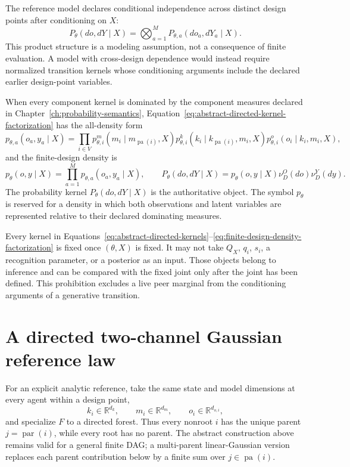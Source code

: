 The reference model declares conditional independence across distinct design points after conditioning on \(X\):
\begin{equation}
P_\theta(do,dY\mid X)
=\bigotimes_{a=1}^{M}P_{\theta,a}(do_a,dY_a\mid X).
\label{eq:finite-design-conditional-product}
\end{equation}
This product structure is a modeling assumption, not a consequence of finite evaluation. A model with cross-design dependence would instead require normalized transition kernels whose conditioning arguments include the declared earlier design-point variables.

When every component kernel is dominated by the component measures declared in Chapter~\ref{ch:probability-semantics}, Equation~\eqref{eq:abstract-directed-kernel-factorization} has the all-density form
\begin{equation}
p_{\theta,a}(o_a,y_a\mid X)
=\prod_{i\in V}
p_{\theta,i}^{m}(m_i\mid m_{\operatorname{pa}(i)},X)
p_{\theta,i}^{k}(k_i\mid k_{\operatorname{pa}(i)},m_i,X)
p_{\theta,i}^{o}(o_i\mid k_i,m_i,X),
\label{eq:abstract-directed-density-factorization}
\end{equation}
and the finite-design density is
\begin{equation}
p_\theta(o,y\mid X)=\prod_{a=1}^{M}p_{\theta,a}(o_a,y_a\mid X),
\qquad
P_\theta(do,dY\mid X)
=p_\theta(o,y\mid X)\nu_D^O(do)\nu_D^Y(dy).
\label{eq:finite-design-density-factorization}
\end{equation}
The probability kernel \(P_\theta(do,dY\mid X)\) is the authoritative object. The symbol \(p_\theta\) is reserved for a density in which both observations and latent variables are represented relative to their declared dominating measures.

Every kernel in Equations~\eqref{eq:abstract-directed-kernels}--\eqref{eq:finite-design-density-factorization} is fixed once \((\theta,X)\) is fixed. It may not take \(Q_X\), \(q_i\), \(s_i\), a recognition parameter, or a posterior as an input. Those objects belong to inference and can be compared with the fixed joint only after the joint has been defined. This prohibition excludes a live peer marginal from the conditioning arguments of a generative transition.

\section{A directed two-channel Gaussian reference law}

For an explicit analytic reference, take the same state and model dimensions at every agent within a design point,
\begin{equation}
k_i\in\mathbb R^{d_k},
\qquad
m_i\in\mathbb R^{d_m},
\qquad
o_i\in\mathbb R^{d_{o,i}},
\label{eq:gaussian-reference-domains}
\end{equation}
and specialize \(F\) to a directed forest. Thus every nonroot \(i\) has the unique parent \(j=\operatorname{par}(i)\), while every root has no parent. The abstract construction above remains valid for a general finite DAG; a multi-parent linear-Gaussian version replaces each parent contribution below by a finite sum over \(j\in\operatorname{pa}(i)\).


